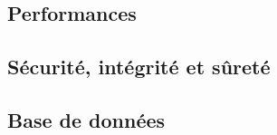 \subsection{Performances}



\subsection{Sécurité, intégrité et sûreté}



\subsection{Base de données}
